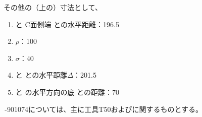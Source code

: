 \clearpage
\begin{hosoku}
その他の（\nameDrawing 上の）寸法として、
\begin{enumerate}[label=\sarrow]
\item \TableCenter{} と C面側\nameJig 端 との水平距離：196.5
\item \ReceiverPlateRadius$\rho$：100
\item \ReceiverPlateWidth$\sigma$：40
\item \TableCenter{} と \ReceiverPlateCenter{} との水平距離$\Delta$：201.5
\item \ReceiverPlateCenter{} と \ReceiverPlate の水平方向の底 との距離：70
\end{enumerate}
\end{hosoku}



\clearpage
\,-\ttNum901074については、主に工具{\ttfamily T50}\TouchSensorProbe および\ToolMeasurementTouchSensorProbe に関するものとする。

